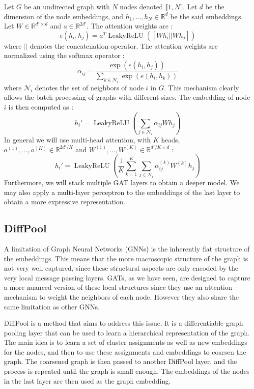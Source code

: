 \documentclass[switch, 11pt]{article}
\DeclareMathOperator{\leakyrelu}{LeakyReLU}
\newcommand{\R}{\mathbb{R}}
\begin{document}
\begin{multicols}{2}
    Let $G$ be an undirected graph with $N$ nodes denoted $\llbracket1, N\rrbracket$. Let $d$ be the dimension of the node embeddings, and $h_1,\dots,h_N\in\R^d$ be the said embeddings. Let $W\in\R^{d'\times d}$ and $a\in\R^{2d'}$. The attention weights are :
    \begin{equation}
        e(h_i,h_j) = a^T \leakyrelu([Wh_i || Wh_j])
    \end{equation}
    where $||$ denotes the concatenation operator. The attention weights are normalized using the softmax operator :
    \begin{equation}
        \alpha_{ij} = \frac{\exp(e(h_i,h_j))}{\sum_{k\in\mathcal{N}_i}\exp(e(h_i,h_k))}
    \end{equation}
    where $\mathcal{N}_i$ denotes the set of neighbors of node $i$ in $G$. This mechanism clearly allows the batch processing of graphs with different sizes. The embedding of node $i$ is then computed as :
    \begin{equation}
        h_i' = \leakyrelu\left(\sum_{j\in\mathcal{N}_i}\alpha_{ij}Wh_j\right)
    \end{equation}
    In general we will use multi-head attention, with $K$ heads, $a^{(1)},\dots,a^{(K)}\in\R^{2d'/K}$ and $W^{(1)},\dots,W^{(K)}\in\R^{d'/K\times d}$ :
    \begin{equation}
        h_i' = \leakyrelu\left(\frac{1}{K}\sum_{k=1}^K\sum_{j\in\mathcal{N}_i}\alpha_{ij}^{(k)}W^{(k)}h_j\right)
    \end{equation}
    Furthermore, we will stack multiple GAT layers to obtain a deeper model. We may also apply a multi-layer perceptron to the embeddings of the last layer to obtain a more expressive representation.


    \subsection{DiffPool}
    A limitation of Graph Neural Networks (GNNs) is the inherently flat structure of the embeddings. This means that the more macroscopic structure of the graph is not very well captured, since these structural aspects are only encoded by the very local message passing layers. GATs, as we have seen, are designed to capture a more nuanced version of these local structures since they use an attention mechanism to weight the neighbors of each node. However they also share the same limitation as other GNNs.

    DiffPool \cite{ying-2018} is a method that aims to address this issue. It is a differentiable graph pooling layer that can be used to learn a hierarchical representation of the graph. The main idea is to learn a set of cluster assignments as well as new embeddings for the nodes, and then to use these assignments and embeddings to coarsen the graph. The coarsened graph is then passed to another DiffPool layer, and the process is repeated until the graph is small enough. The embeddings of the nodes in the last layer are then used as the graph embedding.


\end{multicols}
\end{document}
